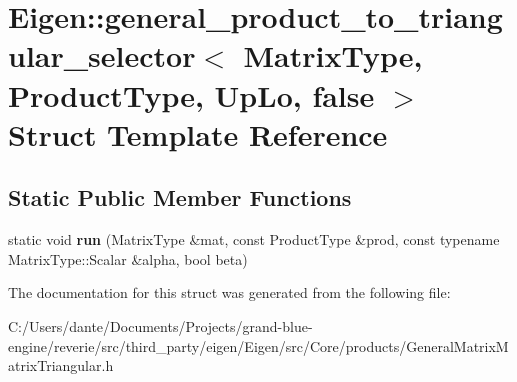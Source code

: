 \hypertarget{struct_eigen_1_1general__product__to__triangular__selector_3_01_matrix_type_00_01_product_type_00_01_up_lo_00_01false_01_4}{}\section{Eigen\+::general\+\_\+product\+\_\+to\+\_\+triangular\+\_\+selector$<$ Matrix\+Type, Product\+Type, Up\+Lo, false $>$ Struct Template Reference}
\label{struct_eigen_1_1general__product__to__triangular__selector_3_01_matrix_type_00_01_product_type_00_01_up_lo_00_01false_01_4}
\subsection*{Static Public Member Functions}
\begin{DoxyCompactItemize}
\item 
\mbox{\label{struct_eigen_1_1general__product__to__triangular__selector_3_01_matrix_type_00_01_product_type_00_01_up_lo_00_01false_01_4_ab4cfef58a2bbaf0c2f8152162c0509d4}} 
static void {\bfseries run} (Matrix\+Type \&mat, const Product\+Type \&prod, const typename Matrix\+Type\+::\+Scalar \&alpha, bool beta)
\end{DoxyCompactItemize}


The documentation for this struct was generated from the following file\+:\begin{DoxyCompactItemize}
\item 
C\+:/\+Users/dante/\+Documents/\+Projects/grand-\/blue-\/engine/reverie/src/third\+\_\+party/eigen/\+Eigen/src/\+Core/products/General\+Matrix\+Matrix\+Triangular.\+h\end{DoxyCompactItemize}
